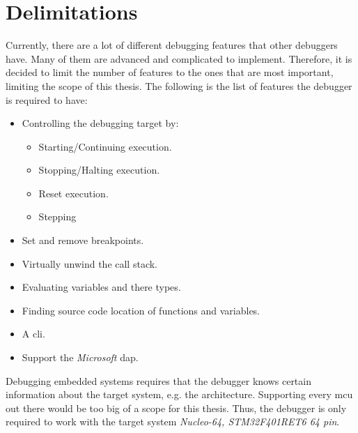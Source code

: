 \section{Delimitations}
\label{sec:delimitations}




Currently, there are a lot of different debugging features that other debuggers have.
Many of them are advanced and complicated to implement.
Therefore, it is decided to limit the number of features to the ones that are most important, limiting the scope of this thesis.
The following is the list of features the debugger is required to have:

\begin{itemize} \label{list:debuggerfeatures}
  \item Controlling the debugging target by:
  \begin{itemize}
    \item Starting/Continuing execution.
    \item Stopping/Halting execution.
    \item Reset execution.
    \item Stepping
  \end{itemize}
  \item Set and remove breakpoints.
  \item Virtually unwind the call stack.
  \item Evaluating variables and there types.
  \item Finding source code location of functions and variables.
  \item A \acrfull{cli}.
  \item Support the \emph{Microsoft} \acrfull{dap}.
\end{itemize}


Debugging embedded systems requires that the debugger knows certain information about the target system, e.g. the architecture.
Supporting every \gls{mcu} out there would be too big of a scope for this thesis.
Thus, the debugger is only required to work with the target system \emph{Nucleo-64, STM32F401RET6 64 pin}.

